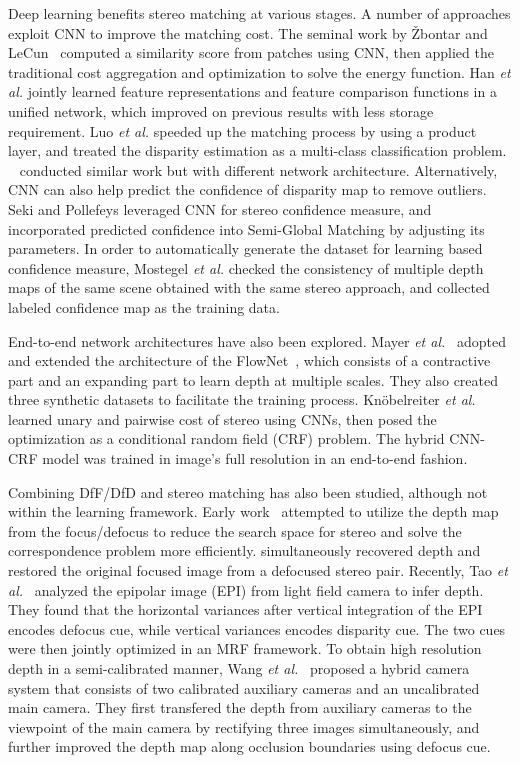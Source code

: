 \documentclass[10pt,twocolumn,letterpaper]{article}
\begin{document}
Deep learning benefits stereo matching at various stages. A number of approaches exploit CNN to improve the matching cost. The seminal work by {\v Z}bontar and LeCun~\cite{zbontar15} computed a similarity score from patches using CNN, then applied the traditional cost aggregation and optimization to solve the energy function. Han \emph{et al.}\cite{han2015matchnet} jointly learned feature representations and feature comparison functions in a unified network, which improved on previous results with less storage requirement. Luo \emph{et al.} \cite{luo16} speeded up the matching process by using a product layer, and treated the disparity estimation as a multi-class classification problem. ~\cite{chen2015deep, zagoruyko15, liu2016euclidean, park2016look} conducted similar work but with different network architecture. Alternatively, CNN can also help predict the confidence of disparity map to remove outliers. Seki and Pollefeys \cite{seki2016patch} leveraged CNN for stereo confidence measure, and incorporated predicted confidence into Semi-Global Matching by adjusting its parameters. In order to automatically generate the dataset for learning based confidence measure, Mostegel \emph{et al.} \cite{mostegel16} checked the consistency of multiple depth maps of the same scene obtained with the same stereo approach, and collected labeled confidence map as the training data.

End-to-end network architectures have also been explored. Mayer \emph{et al.}~\cite{mayer16} adopted and extended the architecture of the FlowNet~\cite{dosovitskiy2015flownet}, which consists of a contractive part and an expanding part to learn depth at multiple scales. They also created three synthetic datasets to facilitate the training process. Kn{\"o}belreiter \emph{et al.}~\cite{knobelreiter2016end} learned unary and pairwise cost of stereo using CNNs, then posed the optimization as a conditional random field (CRF) problem. The hybrid CNN-CRF model was trained in image's full resolution in an end-to-end fashion.

Combining DfF/DfD and stereo matching has also been studied, although not within the learning framework. Early work~\cite{klarquist95, subbarao97} attempted to utilize the depth map from the focus/defocus to reduce the search space for stereo and solve the correspondence problem more efficiently. \cite{Rajagopalan04} simultaneously recovered depth and restored the original focused image from a defocused stereo pair. Recently, Tao \emph{et al.}~\cite{tao13} analyzed the epipolar image (EPI) from light field camera to infer depth. They found that the horizontal variances after vertical integration of the EPI encodes defocus cue, while vertical variances encodes disparity cue. The two cues were then jointly optimized in an MRF framework. To obtain high resolution depth in a semi-calibrated manner, Wang \emph{et al.}~\cite{wang16} proposed a hybrid camera system that consists of two calibrated auxiliary cameras and an uncalibrated main camera. They first transfered the depth from auxiliary cameras to the viewpoint of the main camera by rectifying three images simultaneously, and further improved the depth map along occlusion boundaries using defocus cue.
\end{document}
